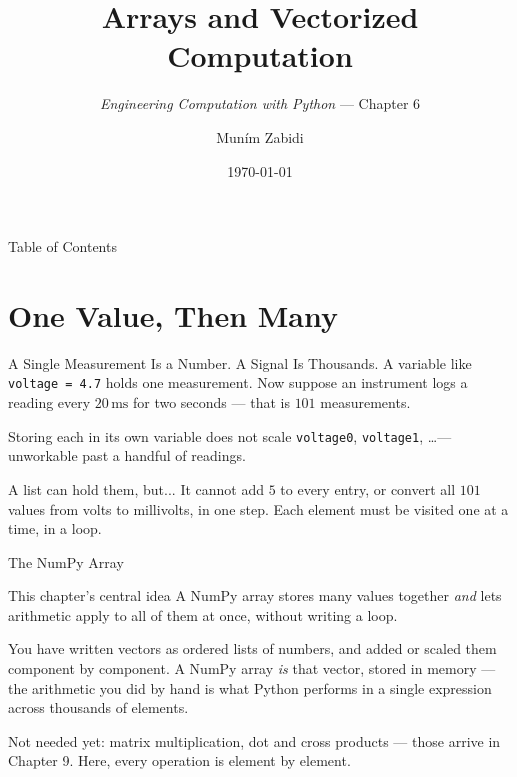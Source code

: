 \documentclass[9pt,aspectratio=169,xcolor=table]{beamer}
\title{Arrays and Vectorized Computation}
\subtitle{\emph{Engineering Computation with Python} --- Chapter 6}
\author{Mun\'{i}m Zabidi}
\institute{\color{primary}Faculty of Electrical Engineering, Universiti Teknologi Malaysia}
\date{\today}
\begin{document}
\titlepage

\begin{frame}{Table of Contents}
    \tableofcontents
\end{frame}

\section{One Value, Then Many}

\begin{frame}{A Single Measurement Is a Number. A Signal Is Thousands.}
    \leavevmode
    A variable like \texttt{voltage = 4.7} holds one measurement. Now
    suppose an instrument logs a reading every $20\,\text{ms}$ for two
    seconds --- that is $101$ measurements.

    \vspace{3mm}
    \begin{block}{Storing each in its own variable does not scale}
        \texttt{voltage0}, \texttt{voltage1}, \ldots --- unworkable past
        a handful of readings.
    \end{block}

    \vspace{2mm}
    \begin{alertblock}{A list can hold them, but...}
        It cannot add $5$ to every entry, or convert all $101$ values
        from volts to millivolts, in one step. Each element must be
        visited \alert{one at a time}, in a loop.
    \end{alertblock}
\end{frame}

\begin{frame}{The NumPy Array}
    \leavevmode
    \begin{block}{This chapter's central idea}
        A NumPy \alert{array} stores many values together \emph{and}
        lets arithmetic apply to \alert{all of them at once}, without
        writing a loop.
    \end{block}

    \vspace{3mm}
    {\small You have written vectors as ordered lists of numbers, and
    added or scaled them component by component. A NumPy array
    \emph{is} that vector, stored in memory --- the arithmetic you did
    by hand is what Python performs in a single expression across
    thousands of elements.}

    \vspace{3mm}
    {\small \alert{Not needed yet}: matrix multiplication, dot and cross
    products --- those arrive in Chapter 9. Here, every operation is
    element by element.}
\end{frame}
\end{document}

